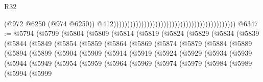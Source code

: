 \begin{lexlean}{R32}
\begin{coremodule}
                                                                                            (@972
                                                                                              @6250
                                                                                              (@974
                                                                                                @6250))
                                                                                            @412))))))))))))))))))))))))))))))))))))))))))))
@6347 := @5794
    (@5799
      (@5804
        (@5809
          (@5814
            (@5819
              (@5824
                (@5829
                  (@5834
                    (@5839
                      (@5844
                        (@5849
                          (@5854
                            (@5859
                              (@5864
                                (@5869
                                  (@5874
                                    (@5879
                                      (@5884
                                        (@5889
                                          (@5894
                                            (@5899
                                              (@5904
                                                (@5909
                                                  (@5914
                                                    (@5919
                                                      (@5924
                                                        (@5929
                                                          (@5934
                                                            (@5939
                                                              (@5944
                                                                (@5949
                                                                  (@5954
                                                                    (@5959
                                                                      (@5964
                                                                        (@5969
                                                                          (@5974
                                                                            (@5979
                                                                              (@5984
                                                                                (@5989
                                                                                  (@5994
                                                                                    (@5999

\end{coremodule}
\end{lexlean}
